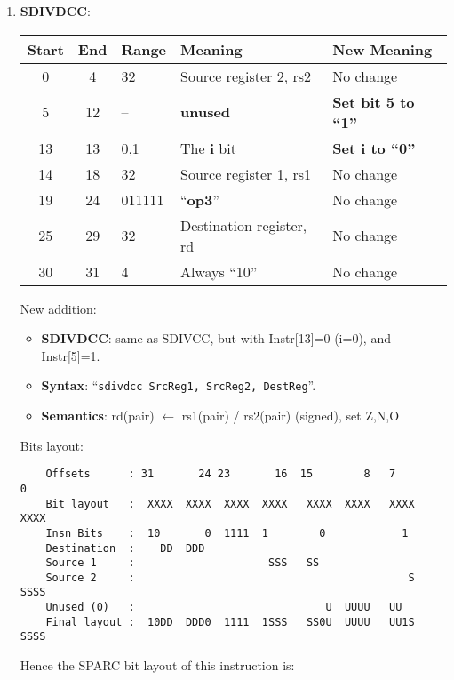 \begin{enumerate}
\item \textbf{SDIVDCC}:\\
  \begin{center}
    \begin{tabular}[p]{|c|c|l|l|l|}
      \hline
      \textbf{Start} & \textbf{End} & \textbf{Range} & \textbf{Meaning} &
                                                                          \textbf{New Meaning}\\
      \hline
      0 & 4 & 32 & Source register 2, rs2 & No change \\
      5 & 12 & -- & \textbf{unused} & \textbf{Set bit 5 to ``1''} \\
      13 & 13 & 0,1 & The \textbf{i} bit & \textbf{Set i to ``0''} \\
      14 & 18 & 32 & Source register 1, rs1 & No change \\
      19 & 24 & 011111 & ``\textbf{op3}'' & No change \\
      25 & 29 & 32 & Destination register, rd & No change \\
      30 & 31 & 4 & Always ``10'' & No change \\
      \hline
    \end{tabular}
  \end{center}
  New addition:
  \begin{itemize}
  \item []\textbf{SDIVDCC}: same as SDIVCC, but with Instr[13]=0 (i=0), and
    Instr[5]=1.
  \item []\textbf{Syntax}: ``\texttt{sdivdcc  SrcReg1, SrcReg2, DestReg}''.
  \item []\textbf{Semantics}: rd(pair) $\leftarrow$ rs1(pair) /
    rs2(pair) (signed), set Z,N,O
  \end{itemize}
  Bits layout:
\begin{verbatim}
    Offsets      : 31       24 23       16  15        8   7        0
    Bit layout   :  XXXX  XXXX  XXXX  XXXX   XXXX  XXXX   XXXX  XXXX
    Insn Bits    :  10       0  1111  1        0            1       
    Destination  :    DD  DDD                                       
    Source 1     :                     SSS   SS
    Source 2     :                                           S  SSSS
    Unused (0)   :                              U  UUUU   UU        
    Final layout :  10DD  DDD0  1111  1SSS   SS0U  UUUU   UU1S  SSSS
\end{verbatim}

  Hence the SPARC bit layout of this instruction is:


\end{enumerate}

